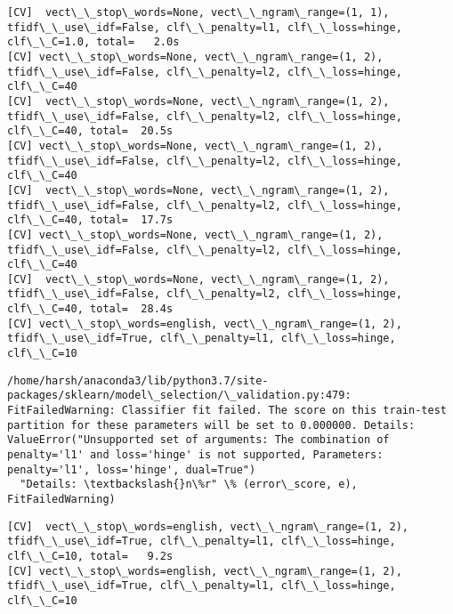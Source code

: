 \documentclass[11pt]{article}
\begin{document}
    \begin{Verbatim}[commandchars=\\\{\}]
[CV]  vect\_\_stop\_words=None, vect\_\_ngram\_range=(1, 1), tfidf\_\_use\_idf=False, clf\_\_penalty=l1, clf\_\_loss=hinge, clf\_\_C=1.0, total=   2.0s
[CV] vect\_\_stop\_words=None, vect\_\_ngram\_range=(1, 2), tfidf\_\_use\_idf=False, clf\_\_penalty=l2, clf\_\_loss=hinge, clf\_\_C=40 
[CV]  vect\_\_stop\_words=None, vect\_\_ngram\_range=(1, 2), tfidf\_\_use\_idf=False, clf\_\_penalty=l2, clf\_\_loss=hinge, clf\_\_C=40, total=  20.5s
[CV] vect\_\_stop\_words=None, vect\_\_ngram\_range=(1, 2), tfidf\_\_use\_idf=False, clf\_\_penalty=l2, clf\_\_loss=hinge, clf\_\_C=40 
[CV]  vect\_\_stop\_words=None, vect\_\_ngram\_range=(1, 2), tfidf\_\_use\_idf=False, clf\_\_penalty=l2, clf\_\_loss=hinge, clf\_\_C=40, total=  17.7s
[CV] vect\_\_stop\_words=None, vect\_\_ngram\_range=(1, 2), tfidf\_\_use\_idf=False, clf\_\_penalty=l2, clf\_\_loss=hinge, clf\_\_C=40 
[CV]  vect\_\_stop\_words=None, vect\_\_ngram\_range=(1, 2), tfidf\_\_use\_idf=False, clf\_\_penalty=l2, clf\_\_loss=hinge, clf\_\_C=40, total=  28.4s
[CV] vect\_\_stop\_words=english, vect\_\_ngram\_range=(1, 2), tfidf\_\_use\_idf=True, clf\_\_penalty=l1, clf\_\_loss=hinge, clf\_\_C=10 

    \end{Verbatim}

    \begin{Verbatim}[commandchars=\\\{\}]
/home/harsh/anaconda3/lib/python3.7/site-packages/sklearn/model\_selection/\_validation.py:479: FitFailedWarning: Classifier fit failed. The score on this train-test partition for these parameters will be set to 0.000000. Details: 
ValueError("Unsupported set of arguments: The combination of penalty='l1' and loss='hinge' is not supported, Parameters: penalty='l1', loss='hinge', dual=True")
  "Details: \textbackslash{}n\%r" \% (error\_score, e), FitFailedWarning)

    \end{Verbatim}

    \begin{Verbatim}[commandchars=\\\{\}]
[CV]  vect\_\_stop\_words=english, vect\_\_ngram\_range=(1, 2), tfidf\_\_use\_idf=True, clf\_\_penalty=l1, clf\_\_loss=hinge, clf\_\_C=10, total=   9.2s
[CV] vect\_\_stop\_words=english, vect\_\_ngram\_range=(1, 2), tfidf\_\_use\_idf=True, clf\_\_penalty=l1, clf\_\_loss=hinge, clf\_\_C=10 

    \end{Verbatim}
\end{document}
